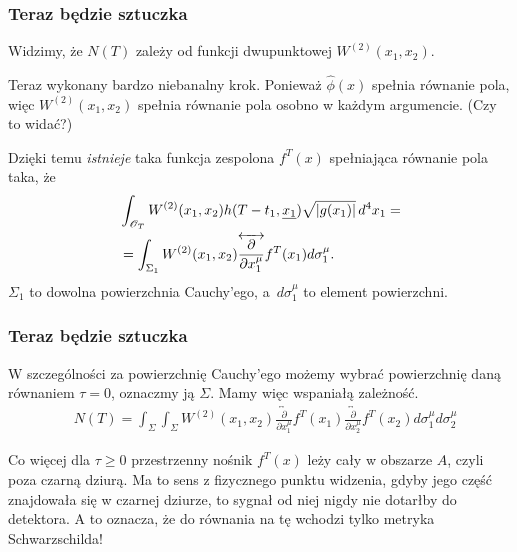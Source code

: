 \documentclass[10pt,t]{beamer}
\begin{document}
\begin{frame}
  \frametitle{Teraz będzie sztuczka}


  Widzimy, że $N( T )$ zależy od funkcji dwupunktowej
  $W^{ ( 2 ) }( x_{ 1 }, x_{ 2 } )$.

  Teraz wykonany bardzo niebanalny krok. Ponieważ
  $\widehat{\phi}( x )$ spełnia równanie pola, więc
  $W^{ ( 2 ) }( x_{ 1 }, x_{ 2 } )$ spełnia równanie pola osobno w
  każdym argumencie. (Czy to widać?)

  Dzięki temu \textit{istnieje} taka funkcja zespolona $f^{ T }( x )$
  spełniająca równanie pola taka, że
  \begin{equation}
    \label{eq:Promieniowanie-Hawkinga-27}
    \begin{split}
      &\int_{ \mathcal{O}_{ T } } W^{ ( 2 ) }( x_{ 1 }, x_{ 2 } )
        h( T - t_{ 1 }, \underline{x_{ 1 }} )
        \sqrt{ | g( x_{ 1 } ) | }\, d^{ 4 }x_{ 1 } = \\
      &= \int_{ \Sigma_{ 1 } } W^{ ( 2 ) }( x_{ 1 }, x_{ 2 } )
        \overleftrightarrow{ \frac{ \partial }{ \partial x_{ 1 }^{ \mu } } }
        f^{ T }( x_{ 1 } ) d\sigma_{ 1 }^{ \mu }.
    \end{split}
  \end{equation}
  $\Sigma_{ 1 }$ to dowolna powierzchnia Cauchy’ego, a~$d\sigma_{ 1 }^{ \mu }$ to
  element powierzchni.

\end{frame}




\begin{frame}
  \frametitle{Teraz będzie sztuczka}


  W szczególności za powierzchnię Cauchy’ego możemy wybrać
  powierzchnię daną równaniem $\tau = 0$, oznaczmy ją $\Sigma$. Mamy
  więc wspaniałą zależność.
  \begin{equation}
    \label{eq:Promieniowanie-Hawkinga-28}
    \begin{split}
      &N( T ) =
        \int_{ \Sigma } \int_{ \Sigma } W^{ ( 2 ) }( x_{ 1 }, x_{ 2 } )
        \overleftrightarrow{ \frac{ \partial }{ \partial x_{ 1 }^{ \mu } } }
        f^{ T }( x_{ 1 } ) \overleftrightarrow{ \frac{ \partial }{ \partial x_{ 2 }^{ \mu } } }
        f^{ T }( x_{ 2 } ) d\sigma_{ 1 }^{ \mu } d\sigma_{ 2 }^{ \mu }
    \end{split}
  \end{equation}

  Co więcej dla $\tau \geq 0$ przestrzenny nośnik $f^{ T }( x )$ leży
  cały w obszarze $A$, czyli poza czarną dziurą. Ma to sens z
  fizycznego punktu widzenia, gdyby jego część znajdowała się w
  czarnej dziurze, to sygnał od niej nigdy nie dotarłby do detektora.
  A to oznacza, że do równania na tę wchodzi tylko metryka
  Schwarzschilda!

\end{frame}
\end{document}
